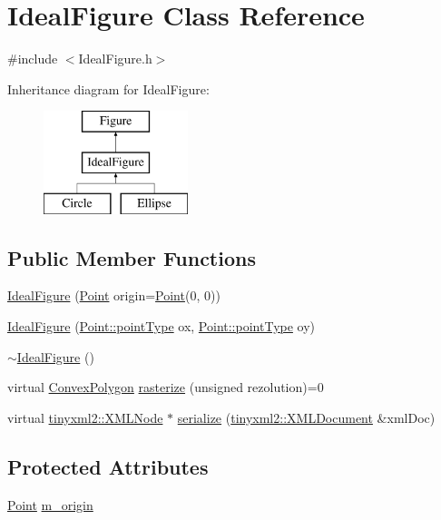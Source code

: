 \hypertarget{class_ideal_figure}{}\section{Ideal\+Figure Class Reference}
\label{class_ideal_figure}


{\ttfamily \#include $<$Ideal\+Figure.\+h$>$}

Inheritance diagram for Ideal\+Figure\+:\begin{figure}[H]
\begin{center}
\leavevmode
\includegraphics[height=3.000000cm]{class_ideal_figure}
\end{center}
\end{figure}
\subsection*{Public Member Functions}
\begin{DoxyCompactItemize}
\item 
\hyperlink{class_ideal_figure_a4df1554384722e84ffdd8c24e776b530}{Ideal\+Figure} (\hyperlink{class_point}{Point} origin=\hyperlink{class_point}{Point}(0, 0))
\item 
\hyperlink{class_ideal_figure_a35194b5caa4bec36ad18979cf9b33698}{Ideal\+Figure} (\hyperlink{class_point_a00b37528c0db634a12ecee9b29d79579}{Point\+::point\+Type} ox, \hyperlink{class_point_a00b37528c0db634a12ecee9b29d79579}{Point\+::point\+Type} oy)
\item 
\hyperlink{class_ideal_figure_a50b77911df4ac52c2aa65ab207e5a2db}{$\sim$\+Ideal\+Figure} ()
\item 
virtual \hyperlink{class_convex_polygon}{Convex\+Polygon} \hyperlink{class_ideal_figure_ae1b50ae419aa258fb7ebc7131e3d4a5d}{rasterize} (unsigned rezolution)=0
\item 
virtual \hyperlink{classtinyxml2_1_1_x_m_l_node}{tinyxml2\+::\+X\+M\+L\+Node} $\ast$ \hyperlink{class_ideal_figure_a5a795a3de8992af3fb9cee4a904b31a5}{serialize} (\hyperlink{classtinyxml2_1_1_x_m_l_document}{tinyxml2\+::\+X\+M\+L\+Document} \&xml\+Doc)
\end{DoxyCompactItemize}
\subsection*{Protected Attributes}
\begin{DoxyCompactItemize}
\item 
\hyperlink{class_point}{Point} \hyperlink{class_ideal_figure_a1d3d83b08736c67e93cf685ba5228814}{m\+\_\+origin}
\end{DoxyCompactItemize}


